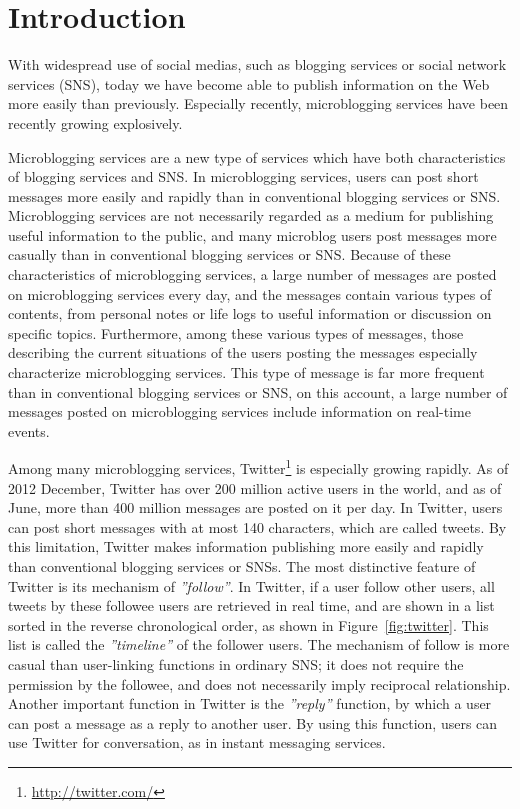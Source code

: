 \section{Introduction}
\label{sec:Introduction}

With widespread use of social medias, such as blogging services or social
network services (SNS), today we have become able to publish information
on the Web more easily than previously.  Especially recently,
microblogging services have been recently growing explosively.

Microblogging services are a new type of services which have both
characteristics of blogging services and SNS.  In microblogging
services, users can post short messages more easily and rapidly than in
conventional blogging services or SNS.  Microblogging services are not
necessarily regarded as a medium for publishing useful information to
the public, and many microblog users post messages more casually than in
conventional blogging services or SNS.  Because of these characteristics
of microblogging services, a large number of messages are posted on
microblogging services every day, and the messages contain various types
of contents, from personal notes or life logs to useful information or
discussion on specific topics. Furthermore, among these various types of
messages, those describing the current situations of the users posting
the messages especially characterize microblogging services.  This type
of message is far more frequent than in conventional blogging services
or SNS, on this account, a large number of messages posted on
microblogging services include information on real-time events.

Among many microblogging services,
Twitter\footnote{\url{http://twitter.com/}} is especially growing
rapidly.  As of 2012 December, Twitter has over 200 million active users
in the world\cite{TwitterUsers}, and as of June, more than 400 million
messages are posted on it per day\cite{TweetsPerDay}.  In Twitter, users
can post short messages with at most 140 characters, which are called
tweets.  By this limitation, Twitter makes information publishing more
easily and rapidly than conventional blogging services or SNSs.  The
most distinctive feature of Twitter is its mechanism of
\emph{''follow''}.  In Twitter, if a user follow other users, all tweets
by these followee users are retrieved in real time, and are shown in a
list sorted in the reverse chronological order, as shown in
Figure~\ref{fig:twitter}.  This list is called the \emph{''timeline''}
of the follower users.  The mechanism of follow is more casual than
user-linking functions in ordinary SNS; it does not require the
permission by the followee, and does not necessarily imply reciprocal
relationship. Another important function in Twitter is the
\emph{''reply''} function, by which a user can post a message as a reply
to another user.  By using this function, users can use Twitter for
conversation, as in instant messaging services.

